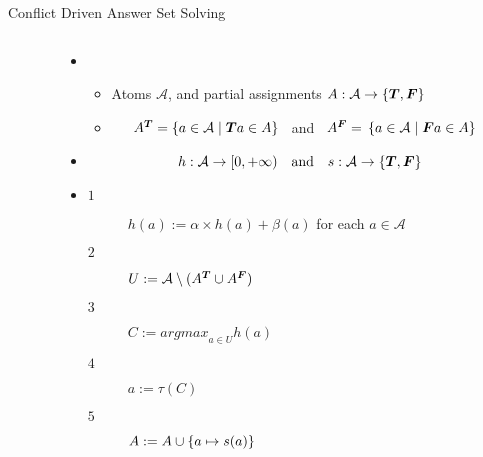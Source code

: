 \begin{block}{Conflict Driven Answer Set Solving}
\begin{columns}
\begin{column}{.02\linewidth}\end{column}
\begin{column}{.98\linewidth}
    \begin{itemize}

    \item {}
      \begin{itemize}
      \item Atoms $\mathcal{A}$, and partial assignments $A: \mathcal{A}\to\{\boldsymbol{T},\boldsymbol{F}\}$
	\item[] \ \ \ 
	  ${A}^{\boldsymbol{T}}=\{a\in\mathcal{A}\mid\boldsymbol{T}{a}\in A\}$ \ and \
	  ${A}^{\boldsymbol{F}}=\,\{a\in\mathcal{A}\mid\boldsymbol{F}{a}\in A\}$
      \end{itemize}

    \medskip %

    \item {}
      \[
      h: \mathcal{A}\to[0,+\infty)
      \quad\text{and}\quad
      s: \mathcal{A}\to\{\boldsymbol{T},\boldsymbol{F}\}
      \]

    \medskip %

    \item {}
    \medskip
      \begin{description}
      \item [$1 \ $] $h(a) := \alpha\times h(a) + \beta(a)$ \hfill for each $a\in\mathcal{A}\qquad$
      \item [$2 \ $] $U:=\mathcal{A}\setminus ({A}^{\boldsymbol{T}}\cup{\ensuremath{A}}^{\boldsymbol{F}})$
      \item [$3 \ $] $C:= \textit{argmax}_{a\in U}h(a)$
      \item [$4 \ $] $a:= \tau(C)$
      \item [$5 \ $] $A := A\cup\{a\mapsto s(a)\}$
      \end{description}
    \end{itemize}

\end{column}

\end{columns}


\end{block}
